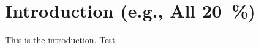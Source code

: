 
\section{Introduction (e.g., All \qty{20}{\percent})}%
\label{sec:Introduction}%

This is the introduction.
Test
